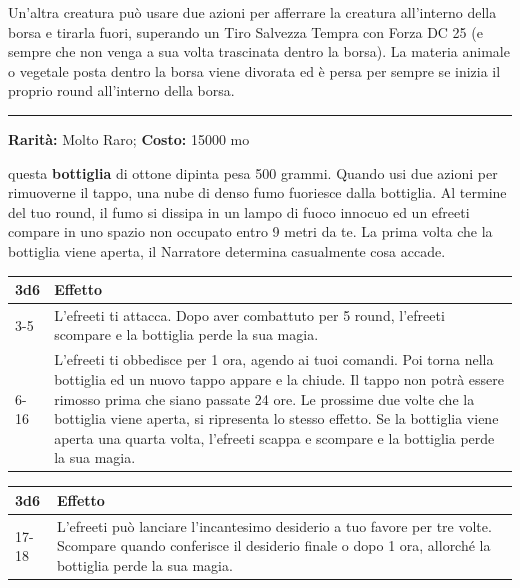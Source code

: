 \begin{multicols}{2}
Un'altra creatura può usare due azioni per afferrare la creatura all'interno della borsa e tirarla fuori, superando un Tiro Salvezza Tempra con Forza DC 25 (e sempre che non venga a sua volta trascinata dentro la borsa). La materia animale o vegetale posta dentro la borsa viene divorata ed è persa per sempre se inizia il proprio round all'interno della borsa.

\smallskip\noindent\rule{\linewidth}{2pt}  \hypertarget{Bottigliadell'Efreeti}{}\smallskip{}\noindent\label{Bottigliadell'Efreeti}

\textbf{Rarità:} Molto Raro; \textbf{Costo:} 15000 mo

questa \textbf{bottiglia} di ottone dipinta pesa 500 grammi. Quando usi due azioni per rimuoverne il tappo, una nube di denso fumo fuoriesce dalla bottiglia. Al termine del tuo round, il fumo si dissipa in un lampo di fuoco innocuo ed un efreeti compare in uno spazio non occupato entro 9 metri da te. La prima volta che la bottiglia viene aperta, il Narratore determina casualmente cosa accade.

\medskip

\begin{tabularx}{0.45\textwidth}{lX}
\textbf{3d6} &\textbf{Effetto}\\
\hline
3-5 & L'efreeti ti attacca. Dopo aver combattuto per 5 round, l'efreeti scompare e la bottiglia perde la sua magia.\\
6-16 &L'efreeti ti obbedisce per 1 ora, agendo ai tuoi comandi. Poi torna nella bottiglia ed un nuovo tappo appare e la chiude. Il tappo non potrà essere rimosso prima che siano passate 24 ore. Le prossime due volte che la bottiglia viene aperta, si ripresenta lo stesso effetto. Se la bottiglia viene aperta una quarta volta, l'efreeti scappa e scompare e la bottiglia perde la sua magia.\\
\end{tabularx}
\begin{tabularx}{0.45\textwidth}{lX}
\textbf{3d6} &\textbf{Effetto}\\
\hline
17-18 & L'efreeti può lanciare l'incantesimo desiderio a tuo favore per tre volte. Scompare quando conferisce il desiderio finale o dopo 1 ora, allorché la bottiglia perde la sua magia.
\end{tabularx}


\end{multicols}
